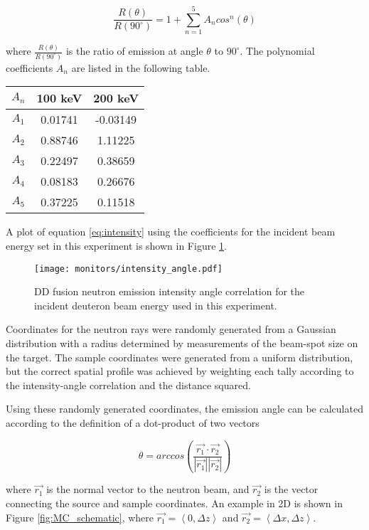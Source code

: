 \documentclass[aps,twocolumn,secnumarabic,balancelastpage,amsmath,amssymb,nofootinbib,floatfix]{revtex4-1}
\begin{document}
\begin{equation}
\frac{R(\theta)}{R(90^{\circ})}=1+\sum_{n=1}^5 A_n cos^n(\theta)
\label{eq:intensity}
\end{equation}

where $\frac{R(\theta)}{R(90^{\circ})}$ is the ratio of emission at angle $\theta$ to $90^{\circ}$.  The polynomial coefficients $A_n$ are listed in the following table. \\

\begin{ruledtabular}
\begin{tabular}{ccc}
$A_n$ & 100 keV & 200 keV \\ 
\hline 
$A_1$ & 0.01741 & -0.03149 \\ 
$A_2$ & 0.88746 & 1.11225 \\ 
$A_3$ & 0.22497 & 0.38659 \\
$A_4$ & 0.08183 & 0.26676 \\
$A_5$ & 0.37225 & 0.11518 \\ 
\end{tabular}
\end{ruledtabular}

A plot of equation \ref{eq:intensity} using the coefficients for the incident beam energy set in this experiment is shown in Figure \ref{fig:intensity_angle}.

\begin{figure}[htb]
\texttt{[image: monitors/intensity\_angle.pdf]}
\caption{DD fusion neutron emission intensity angle correlation for the incident deuteron beam energy used in this experiment.
}
\label{fig:intensity_angle}
\end{figure}

Coordinates for the neutron rays were randomly generated from a Gaussian distribution with a radius determined by measurements of the beam-spot size on the target.  The sample coordinates were generated from a uniform distribution, but the correct spatial profile was achieved by weighting each tally according to the intensity-angle correlation and the distance squared.

Using these randomly generated coordinates, the emission angle can be calculated according to the definition of a dot-product of two vectors

\begin{equation}
\theta = arccos(\frac{\vec{r_1}\cdot\vec{r_2}}{|\vec{r_1}||\vec{r_2}|})
\end{equation}

where $\vec{r_1}$ is the normal vector to the neutron beam, and $\vec{r_2}$ is the vector connecting the source and sample coordinates.  An example in 2D is shown in Figure \ref{fig:MC_schematic}, where $\vec{r_1}=\left< 0, \Delta z \right>$ and $\vec{r_2}=\left< \Delta x, \Delta z \right>$.
\end{document}
